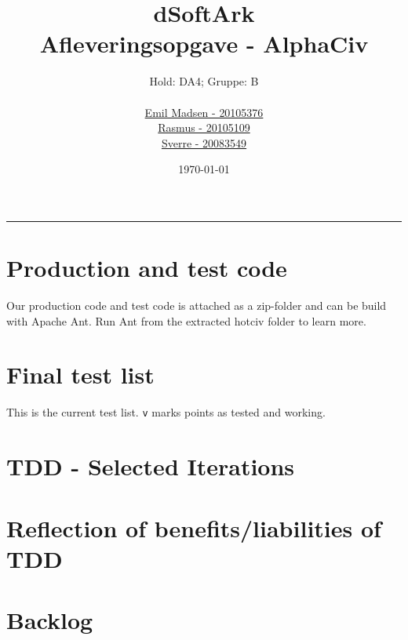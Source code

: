 \title{\huge dSoftArk \\
       \small Afleveringsopgave - AlphaCiv}
\author{Hold: DA4; Gruppe: B\\ \\
        \href{mailto:skeen@cs.au.dk}{Emil Madsen - 20105376}\\
        \href{mailto:emray@cs.au.dk}{Rasmus - 20105109}\\
        \href{mailto:sverre@cs.au.dk}{Sverre - 20083549}
       }
\date{\today}

\maketitle

\hrule

\section*{Production and test code} 
Our production code and test code is attached as a zip-folder and can be build with Apache Ant.
Run Ant from the extracted hotciv folder to learn more.

\section*{Final test list} 
This is the current test list. \texttt{v} marks points as tested and working.

\section*{TDD - Selected Iterations}
    

\section*{Reflection of benefits/liabilities of TDD}
    

\section*{Backlog} 
    
